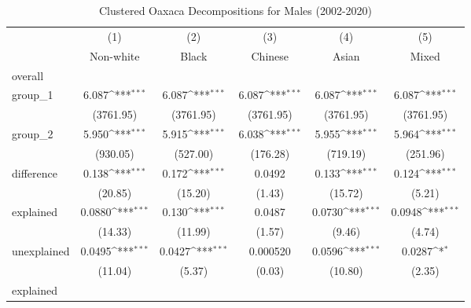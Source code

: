 \begin{table}[htbp]\centering
\def\sym#1{\ifmmode^{#1}\else\(^{#1}\)\fi}
\caption{Clustered Oaxaca Decompositions for Males (2002-2020)\label{tab1}}
\begin{tabular}{l*{5}{c}}
\hline\hline
            &\multicolumn{1}{c}{(1)}&\multicolumn{1}{c}{(2)}&\multicolumn{1}{c}{(3)}&\multicolumn{1}{c}{(4)}&\multicolumn{1}{c}{(5)}\\
            &\multicolumn{1}{c}{Non-white}&\multicolumn{1}{c}{Black}&\multicolumn{1}{c}{Chinese}&\multicolumn{1}{c}{Asian}&\multicolumn{1}{c}{Mixed}\\
\hline
overall     &                     &                     &                     &                     &                     \\
group\_1     &       6.087\sym{***}&       6.087\sym{***}&       6.087\sym{***}&       6.087\sym{***}&       6.087\sym{***}\\
            &   (3761.95)         &   (3761.95)         &   (3761.95)         &   (3761.95)         &   (3761.95)         \\
group\_2     &       5.950\sym{***}&       5.915\sym{***}&       6.038\sym{***}&       5.955\sym{***}&       5.964\sym{***}\\
            &    (930.05)         &    (527.00)         &    (176.28)         &    (719.19)         &    (251.96)         \\
difference  &       0.138\sym{***}&       0.172\sym{***}&      0.0492         &       0.133\sym{***}&       0.124\sym{***}\\
            &     (20.85)         &     (15.20)         &      (1.43)         &     (15.72)         &      (5.21)         \\
explained   &      0.0880\sym{***}&       0.130\sym{***}&      0.0487         &      0.0730\sym{***}&      0.0948\sym{***}\\
            &     (14.33)         &     (11.99)         &      (1.57)         &      (9.46)         &      (4.74)         \\
unexplained &      0.0495\sym{***}&      0.0427\sym{***}&    0.000520         &      0.0596\sym{***}&      0.0287\sym{*}  \\
            &     (11.04)         &      (5.37)         &      (0.03)         &     (10.80)         &      (2.35)         \\
\hline
explained   &                     &                     &                     &                     &                     \\

\end{tabular}
\end{table}
